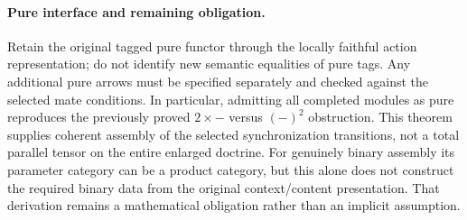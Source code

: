 \documentclass{article}
\begin{document}
\paragraph{Pure interface and remaining obligation.} Retain the original tagged pure functor through the locally faithful action representation; do not identify new semantic equalities of pure tags. Any additional pure arrows must be specified separately and checked against the selected mate conditions. In particular, admitting all completed modules as pure reproduces the previously proved $2\times-$ versus $(-)^2$ obstruction. This theorem supplies coherent assembly of the selected synchronization transitions, not a total parallel tensor on the entire enlarged doctrine. For genuinely binary assembly its parameter category can be a product category, but this alone does not construct the required binary data from the original context/content presentation. That derivation remains a mathematical obligation rather than an implicit assumption.
\end{document}
